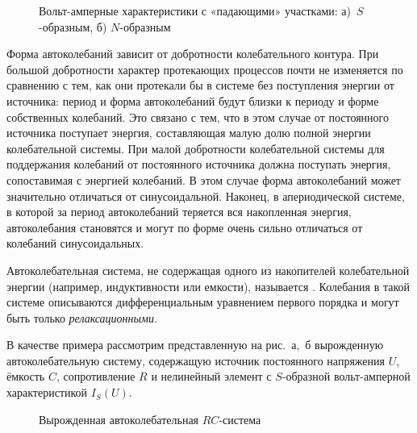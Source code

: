 \begin{figure}[h!]
	\centering\small
	\caption{Вольт-амперные характеристики с «падающими» участками: а)~$S$-образным, б) $N$-образным}
\end{figure}

Форма автоколебаний зависит от добротности колебательного контура. При большой
добротности характер протекающих процессов почти не изменяется по сравнению с
тем, как они протекали бы в системе без поступления
энергии от источника: период и форма автоколебаний будут близки к периоду и
форме собственных колебаний. Это связано с тем, что в этом случае от постоянного
источника поступает энергия, составляющая малую
долю полной энергии колебательной системы. При малой добротности колебательной системы 
для поддержания колебаний от постоянного
источника должна поступать энергия, сопоставимая с энергией колебаний. В этом
случае форма автоколебаний может значительно отличаться от синусоидальной.
Наконец, в апериодической системе, в которой за период автоколебаний теряется вся
накопленная энергия, автоколебания становятся  и
могут по форме очень сильно отличаться от колебаний синусоидальных.

\label{subsec:auto:vyr}

Автоколебательная система, не содержащая одного из накопителей колебательной
энергии (например, индуктивности или емкости), называется . Колебания в такой системе
описываются дифференциальным уравнением первого порядка и могут быть
только \emph{релаксационными}.

В качестве примера рассмотрим представленную на рис.~а,~б
вырожденную автоколебательную систему, содержащую источник
постоянного напряжения $U$, ёмкость $C$, сопротивление $R$ и нелинейный элемент
с $S$-образной вольт-амперной характеристикой $I_S(U)$. 

\begin{figure}[h]
	\begin{minipage}[h]{0.49\linewidth}
		\centering
	\end{minipage}
	\hfill
	\begin{minipage}[h]{0.49\linewidth}
		\centering
	\end{minipage}
	\caption{Вырожденная автоколебательная $RC$-система}
\end{figure}

